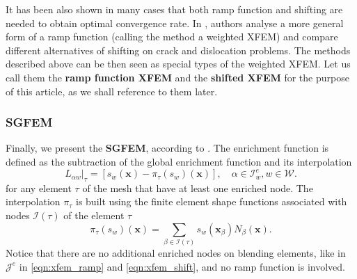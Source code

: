 \documentclass{elsarticle}
\def\vc#1{\mathbf{\boldsymbol{#1}}}     %
\newcommand{\bx}{\vc{x}}
\begin{document}
It has been also shown in many cases that both ramp function and shifting are needed to obtain optimal convergence rate.
In \cite{ventura_fast_2009}, authors analyse a more general form of a ramp function (calling the method a weighted XFEM)
and compare different alternatives of shifting on crack and dislocation problems. The methods described above can be then seen
as special types of the weighted XFEM. Let us call them the \textbf{ramp function XFEM}  
and the \textbf{shifted XFEM} for the purpose of this article, as we shall reference to them later.

\subsubsection{SGFEM}
Finally, we present the \textbf{SGFEM}, according to \cite{babuska_stable_2012,gupta_stable_2013}. 
The enrichment function is defined as the subtraction of the global enrichment function and its interpolation 
\begin{equation} \label{eqn:sgfem_enrich}
    L_{\alpha w}|_{\tau} = \left[s_w(\bx) - \pi_\tau (s_w)(\bx)\right],
    \quad \alpha\in\mathcal{I}^e_w, w\in\mathcal{W}.
\end{equation} 
for any element $\tau$ of the mesh that have at least one enriched node.
The interpolation $\pi_\tau$ is built using the finite element shape functions
associated with nodes $\mathcal{I}(\tau)$ of the element $\tau$
\begin{equation} \label{eqn:sgfem_interpolation}
    \pi_\tau (s_w)(\bx) = \sum_{\beta\in\mathcal{I}(\tau)} s_w(\bx_\beta) N_\beta(\bx).
\end{equation}
Notice that there are no additional enriched nodes on blending elements, like in $\mathcal{J}^e$ in 
\eqref{eqn:xfem_ramp} and \eqref{eqn:xfem_shift}, and no ramp function is involved.
\end{document}
